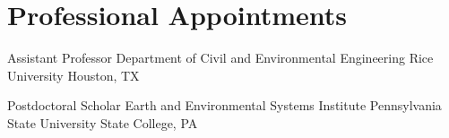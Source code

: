 \section{Professional Appointments}

{Assistant Professor}
{Department of Civil and Environmental Engineering}
{Rice University}
{Houston, TX}
{}

{Postdoctoral Scholar}
{Earth and Environmental Systems Institute}
{Pennsylvania State University}
{State College, PA}
{}
